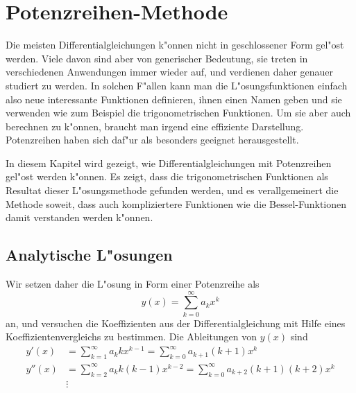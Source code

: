 %
%
%
\chapter{Potenzreihen-Methode\label{chapter:potenzreihen}}
\rhead{}
Die meisten Differentialgleichungen k"onnen nicht in geschlossener
Form gel"ost werden.
Viele davon sind aber von generischer Bedeutung, sie treten
in verschiedenen Anwendungen immer wieder auf, und verdienen daher
genauer studiert zu werden.
In solchen F"allen kann man die L"osungsfunktionen einfach also
neue interessante Funktionen definieren, ihnen einen Namen geben
und sie verwenden wie zum Beispiel die trigonometrischen Funktionen.
Um sie aber auch berechnen zu k"onnen, braucht man irgend eine 
effiziente Darstellung.
Potenzreihen haben sich daf"ur als besonders geeignet herausgestellt.

In diesem Kapitel wird gezeigt, wie Differentialgleichungen mit Potenzreihen
gel"ost werden k"onnen.
Es zeigt, dass die trigonometrischen Funktionen als Resultat
dieser L"osungsmethode gefunden werden, und es verallgemeinert die
Methode soweit, dass auch kompliziertere Funktionen wie die
Bessel-Funktionen damit verstanden werden k"onnen.

\section{Analytische L"osungen
\label{section:potenzreihen:analytisch}}
Wir setzen daher die L"osung in Form einer Potenzreihe als
\begin{equation}
y(x)
=
\sum_{k=0}^\infty a_kx^k
\label{potenzreihen:ansatz}
\end{equation}
an, und versuchen die Koeffizienten aus der Differentialgleichung mit
Hilfe eines Koeffizientenvergleichs zu bestimmen.
Die Ableitungen von $y(x)$ sind
\begin{equation}
\begin{aligned}
y'(x)
&=
\sum_{k=1}^\infty a_kkx^{k-1}
=
\sum_{k=0}^\infty a_{k+1}(k+1)x^k
\\
y''(x)
&=
\sum_{k=2}^\infty a_kk(k-1)x^{k-2}
=
\sum_{k=0}^\infty a_{k+2}(k+1)(k+2)x^k 
\\
&\vdots
\end{aligned}
\label{potenzreihen:ableitungen}
\end{equation}

